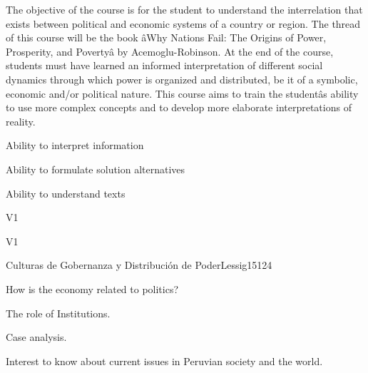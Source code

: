 \begin{syllabus}


\begin{justification}
The objective of the course is for the student to understand the interrelation that exists between political and economic systems of a country or region. The thread of this course will be the book âWhy Nations Fail: The Origins of Power, Prosperity, and Povertyâ by Acemoglu-Robinson.
At the end of the course, students must have learned an informed interpretation of different social dynamics through which power is organized and distributed, be it of a symbolic, economic and/or political nature. This course aims to train the studentâs ability to use more complex concepts and to develop more elaborate interpretations of reality. 
\end{justification}

\begin{goals}
\item Ability to interpret information
\item Ability to formulate solution alternatives
\item Ability to understand texts 
\end{goals}

\begin{outcomes}{V1}
    \item {}
    \item {}
    \item {}
    
\end{outcomes}

\begin{competences}{V1}
    \item {}
    \item {}
    \item {}
    \item {}
\end{competences}

\begin{unit}{Culturas de Gobernanza y Distribución de Poder}{}{Lessig15}{12}{4}
   \begin{topics}
      \item How is the economy related to politics?
      \item The role of Institutions.
      \item Case analysis.
   \end{topics}
   \begin{learningoutcomes}
      \item Interest to know about current issues in Peruvian society and the world.
   \end{learningoutcomes}
\end{unit}

\begin{coursebibliography}
\end{coursebibliography}

\end{syllabus}
